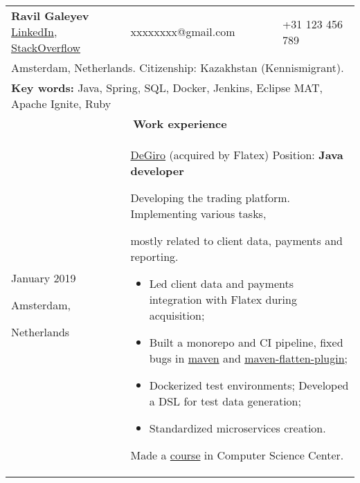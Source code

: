 \documentclass{article}
\begin{document}
\begin{longtable}{p{0.00in}p{0.00in}p{0.0in}p{0.00in}p{0.00in}}
\multicolumn{3}{p{\dimexpr3.00in+4\tabcolsep\relax}}{{\fontsize{16pt}{19.2pt}\selectfont
    \textbf{Ravil Galeyev}}
    \href{https://www.linkedin.com/in/ravil-galeyev-9a7540102}{LinkedIn},
    \href{http://stackoverflow.com/story/dehasi}{StackOverflow}
} &
\multicolumn{1}{l}{xxxxxxxx@gmail.com} &
\multicolumn{1}{l}{+31 123 456 789} \\

\multicolumn{5}{p{\dimexpr7.00in+8\tabcolsep\relax}}{
    Amsterdam, Netherlands. Citizenship: Kazakhstan (Kennismigrant).
\par} \\

\multicolumn{5}{p{\dimexpr7.00in+8\tabcolsep\relax}}{
    \textbf{Key words:} Java, Spring, SQL, Docker, Jenkins, Eclipse MAT, Apache Ignite, Ruby
\par} \\

\multicolumn{5}{c}{\textbf{Work experience}} \\

\multicolumn{2}{p{\dimexpr1.00in+2\tabcolsep\relax}}{January 2019 \par Amsterdam,\par Netherlands} &
\multicolumn{3}{p{\dimexpr5.85in+4\tabcolsep\relax}}{\href{https://degiro.nl}{DeGiro} (acquired by Flatex)
Position: \textbf{Java developer} \par
Developing the trading platform. Implementing various tasks,
\par mostly related to client data, payments and reporting.
\begin{itemize}
    \item Led client data and payments integration with Flatex during acquisition;
    \item Built a monorepo and CI pipeline, fixed bugs in
        \href{https://github.com/apache/maven/pull/347}{maven}
        and  \href{https://github.com/mojohaus/flatten-maven-plugin/pull/152}{maven-flatten-plugin};
    \item Dockerized test environments; Developed a DSL for test data generation;
    \item Standardized microservices creation.
\end{itemize}
    Made a \href{https://compscicenter.ru/courses/practical-minimum/}{course} in Computer Science Center.
\par} \\


\end{longtable}
\end{document}
